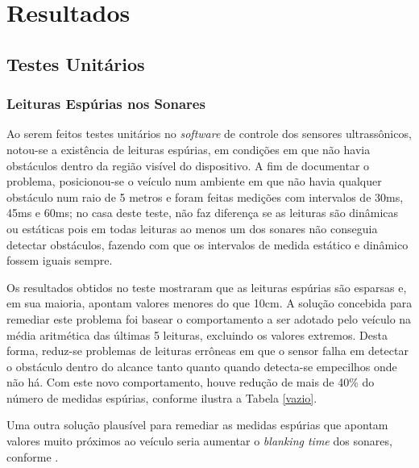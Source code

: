 \chapter{Resultados}

\section{Testes Unitários}

\subsection{Leituras Espúrias nos Sonares}
Ao serem feitos testes unitários no \textit{software} de controle dos sensores ultrassônicos, notou-se a existência de leituras espúrias, em 
condições em que não havia obstáculos dentro da região visível do dispositivo.
A fim de documentar o problema, posicionou-se o veículo num ambiente em que não havia qualquer obstáculo num raio de 5 metros e foram feitas medições 
com intervalos de 30ms, 45ms e 60ms; no casa deste teste, não faz diferença se as leituras são dinâmicas ou estáticas pois em todas leituras ao menos 
um dos sonares não conseguia detectar obstáculos, fazendo com que os intervalos de medida estático e dinâmico fossem iguais sempre.

Os resultados obtidos no teste mostraram que as leituras espúrias são esparsas e, em sua maioria, apontam valores menores do que 10cm.
A solução concebida para remediar este problema foi basear o comportamento a ser adotado pelo veículo na média aritmética das últimas 5 leituras, 
excluindo os valores extremos. 
Desta forma, reduz-se problemas de leituras errôneas em que o sensor falha em detectar o obstáculo dentro do alcance tanto quanto quando detecta-se 
empecilhos onde não há.
Com este novo comportamento, houve redução de mais de 40\% do número de medidas espúrias, conforme ilustra a Tabela \ref{vazio}.

Uma outra solução plausível para remediar as medidas espúrias que apontam valores muito próximos ao veículo seria aumentar o \textit{blanking time} 
dos sonares, conforme .


